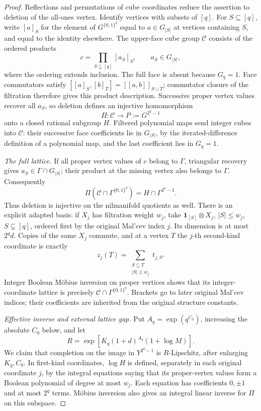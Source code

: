 \documentclass[11pt,a4paper]{article}
\theoremstyle{definition}
\newcommand{\one}{\mathbf 1}
\begin{document}
\begin{proof}
Reflections and permutations of cube coordinates reduce the assertion
to deletion of the all-ones vertex.  Identify vertices with subsets of
\([q]\).  For \(S\subseteq[q]\), write \([a]_S\) for the element of
\(G^{\{0,1\}^q}\) equal to \(a\in G_{|S|}\) at vertices containing
\(S\), and equal to the identity elsewhere.  The upper-face cube group
\(\mathcal C\) consists of the ordered products
\[
 c=\prod_{S\subsetneq[q]}[a_S]_S,\qquad a_S\in G_{|S|},
\]
where the ordering extends inclusion.  The full face is absent because
\(G_q=1\).  Face commutators satisfy
\([[a]_S,[b]_T]=[[a,b]]_{S\cup T}\); commutator closure of the
filtration therefore gives this product description.  Successive
proper vertex values recover all \(a_S\), so deletion defines an
injective homomorphism
\[
 \Pi:\mathcal C\longrightarrow P:=G^{2^q-1}
\]
onto a closed rational subgroup \(H\).  Filtered polynomial maps send
integer cubes into \(\mathcal C\): their successive face coefficients
lie in \(G_{|S|}\), by the iterated-difference definition of a
polynomial map, and the last coefficient lies in \(G_q=1\).

\textit{The full lattice.}
If all proper vertex values of \(c\) belong to \(\Gamma\), triangular
recovery gives \(a_S\in\Gamma\cap G_{|S|}\); their product at the
missing vertex also belongs to \(\Gamma\).  Consequently
\begin{equation}\label{single:completion-lattice}
 \Pi(\mathcal C\cap\Gamma^{\{0,1\}^q})
       =H\cap\Gamma^{2^q-1}.
\end{equation}
Thus deletion is injective on the nilmanifold quotients as well.
There is an explicit adapted basis: if \(X_j\) has filtration weight
\(w_j\), take \(\one_{[S]}\otimes X_j\),
\(|S|\le w_j\), \(S\subsetneq[q]\), ordered first by the original
Mal'cev index \(j\).  Its dimension is at most \(2^qd\).
Copies of the same \(X_j\) commute, and at a vertex \(T\) the
\(j\)-th second-kind coordinate is exactly
\[
 z_j(T)=\sum_{\substack{S\subseteq T\\ |S|\le w_j}}t_{j,S}.
\]
Integer Boolean M\"obius inversion on proper vertices shows that its
integer-coordinate lattice is precisely
\(\mathcal C\cap\Gamma^{\{0,1\}^q}\).  Brackets go to later
original Mal'cev indices; their coefficients are inherited from the
original structure constants.

\textit{Effective inverse and external lattice gap.}
Put \(A_q=\exp(q^{C_0})\), increasing the absolute \(C_0\) below,
and let
\[
 R=\exp\!\left[K_q(1+d)^{A_q}(1+\log M)\right].
\]
We claim that completion on the image in \(Y^{2^q-1}\) is
\(R\)-Lipschitz, after enlarging \(K_q,C_0\).
In first-kind coordinates, \(\log H\) is defined, separately in
each original coordinate \(j\), by the integral equations saying
that its proper-vertex values form a Boolean polynomial of degree
at most \(w_j\).  Each equation has coefficients \(0,\pm1\) and
at most \(2^q\) terms.  M\"obius inversion also gives an integral
linear inverse for \(\Pi\) on this subspace.


\end{proof}
\end{document}
